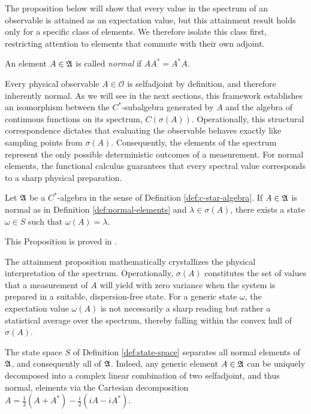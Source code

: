 \noindent The proposition below will show that every value in the spectrum of an observable is attained as an expectation value, but this attainment result holds only for a specific class of elements. We therefore isolate this class first, restricting attention to elements that commute with their own adjoint.

\begin{definition}\label{def:normal-elements}
	An element $A \in \mathfrak{A}$ is called \emph{normal} if $AA^*=A^*A$.
\end{definition}

Every physical observable $A \in \mathcal{O}$ is selfadjoint by definition, and therefore inherently normal. As we will see in the next sections, this framework establishes an isomorphism between the $C^*$-subalgebra generated by $A$ and the algebra of continuous functions on its spectrum, $C(\sigma(A))$. Operationally, this structural correspondence dictates that evaluating the observable behaves exactly like sampling points from $\sigma(A)$. Consequently, the elements of the spectrum represent the only possible deterministic outcomes of a measurement. For normal elements, the functional calculus guarantees that every spectral value corresponds to a sharp physical preparation.

\begin{proposition}
	Let $\mathfrak{A}$ be a $C^*$-algebra in the sense of Definition \ref{def:c-star-algebra}. If $A\in\mathfrak{A}$ is normal as in Definition \ref{def:normal-elements} and $\lambda\in\sigma(A)$, there exists a state $\omega\in S$ such that $\omega(A)=\lambda$.
\end{proposition}

\noindent This Proposition is proved in \cite[Theorem 3.3.6]{murphyCalgebrasOperatorTheory1990}.

\begin{remark}
	The attainment proposition mathematically crystallizes the physical interpretation of the spectrum. Operationally, $\sigma(A)$ constitutes the set of values that a measurement of $A$ will yield with zero variance when the system is prepared in a suitable, dispersion-free state. For a generic state $\omega$, the expectation value $\omega(A)$ is not necessarily a sharp reading but rather a statistical average over the spectrum, thereby falling within the convex hull of $\sigma(A)$.
\end{remark}

\begin{corollary}
	The state space $S$ of Definition \ref{def:state-space} separates all normal elements of $\mathfrak{A}$, and consequently all of $\mathfrak{A}$. Indeed, any generic element $A\in\mathfrak{A}$ can be uniquely decomposed into a complex linear combination of two selfadjoint, and thus normal, elements via the Cartesian decomposition $A=\tfrac12(A+A^*)-\tfrac{i}{2}(iA-iA^*)$.
\end{corollary}

